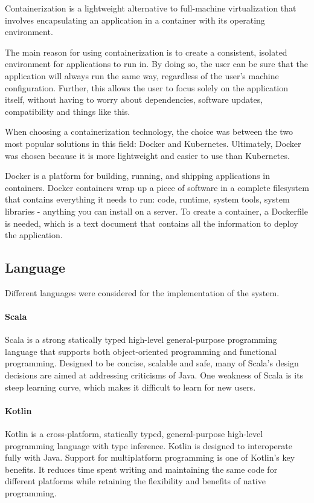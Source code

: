 \documentclass[12pt,a4paper,openright,twoside]{book}
\begin{document}
Containerization is a lightweight alternative to full-machine virtualization that involves encapsulating an application in a container with its operating environment.

The main reason for using containerization is to create a consistent, isolated environment for applications to run in.
By doing so, the user can be sure that the application will always run the same way, regardless of the user's machine configuration. 
Further, this allows the user to focus solely on the application itself, without having to worry about dependencies, software updates, compatibility and things like this.

When choosing a containerization technology, the choice was between the two most popular solutions in this field: Docker and Kubernetes.
Ultimately, Docker was chosen because it is more lightweight and easier to use than Kubernetes.

Docker is a platform for building, running, and shipping applications in containers.
Docker containers wrap up a piece of software in a complete filesystem that contains everything it needs to run:
code, runtime, system tools, system libraries - anything you can install on a server.
To create a container, a Dockerfile is needed, which is a text document that contains all the information to deploy the application.

\subsection{Language}
Different languages were considered for the implementation of the system.

\paragraph*{Scala}
Scala is a strong statically typed high-level general-purpose programming language that supports both object-oriented 
programming and functional programming. 
Designed to be concise, scalable and safe, many of Scala's design decisions are aimed at addressing criticisms of Java.
\cite{1}
One weakness of Scala is its steep learning curve, which makes it difficult to learn for new users.

\paragraph*{Kotlin}
Kotlin is a cross-platform, statically typed, general-purpose high-level programming language with type inference. 
Kotlin is designed to interoperate fully with Java.
Support for multiplatform programming is one of Kotlin’s key benefits. It reduces time spent writing and maintaining 
the same code for different platforms while retaining the flexibility and benefits of native programming.
\end{document}
